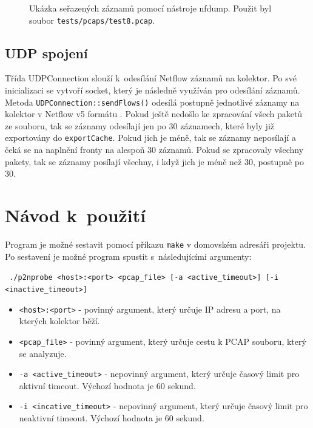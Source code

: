 \documentclass[a4paper, 11pt]{article}
\begin{document}
\begin{sloppypar}
\begin{figure}[!ht]
    \begin{center}
        \caption{Ukázka seřazených záznamů pomocí nástroje nfdump. Použit byl soubor \texttt{tests/pcaps/test8.pcap}.}
        \label{fig2}
    \end{center}
\end{figure}


\subsection{UDP spojení}
Třída UDPConnection slouží k~odesílání Netflow záznamů na kolektor. Po své inicializaci se vytvoří socket, který je následně využíván pro odesílání záznamů. Metoda \texttt{UDPConnection::sendFlows()} odesílá postupně jednotlivé záznamy na kolektor v Netflow v5 formátu \cite{netflow5}. Pokud ještě nedošlo ke zpracování všech paketů ze souboru, tak se záznamy odesílají jen po 30 záznamech, které byly již exportovány do \verb|exportCache|. Pokud jich je méně, tak se záznamy neposílají a čeká se na naplnění fronty na alespoň 30 záznamů. Pokud se zpracovaly všechny pakety, tak se záznamy posílají všechny, i když jich je méně než 30, postupně po 30.

\section{Návod k~použití}

Program je možné sestavit pomocí příkazu \texttt{make} v domovském adresáři projektu. Po sestavení je možné program spustit s~následujícími argumenty:

\vspace{0.1cm}
\texttt{
    ./p2nprobe <host>:<port> <pcap\_file> [-a <active\_timeout>] 
            [-i <inactive\_timeout>]
}

\begin{itemize}
    \item \texttt{<host>:<port>} - povinný argument, který určuje IP adresu a port, na kterých kolektor běží.
    \item \texttt{<pcap\_file>} - povinný argument, který určuje cestu k PCAP souboru, který se analyzuje.
    \item \texttt{-a <active\_timeout>} - nepovinný argument, který určuje časový limit pro aktivní timeout. Výchozí hodnota je 60 sekund.
    \item \texttt{-i <incative\_timeout>} - nepovinný argument, který určuje časový limit pro neaktivní timeout. Výchozí hodnota je 60 sekund.
\end{itemize}


\end{sloppypar}
\end{document}
